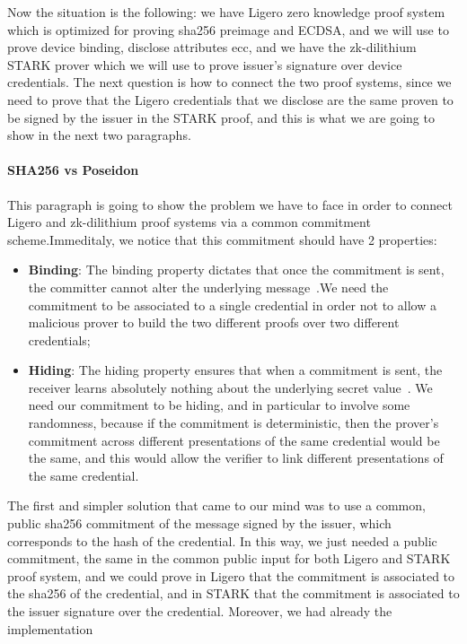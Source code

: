 \documentclass{article}
\begin{document}
Now the situation is the following: we have Ligero zero knowledge proof system which is optimized for proving sha256 preimage
and ECDSA, and we will use to prove device binding, disclose attributes ecc, and we have the zk-dilithium STARK prover
which we will use to prove issuer's signature over device credentials. The next question is how to connect the two proof systems, 
since we need to prove that the Ligero credentials that we disclose are the same proven to be signed by the issuer in the STARK proof,
and this is what we are going to show in the next two paragraphs.

\paragraph{SHA256 vs Poseidon}
This paragraph is going to show the problem we have to face in order to connect Ligero and zk-dilithium proof systems via a 
common commitment scheme.Immeditaly, we notice that this commitment should have 2 properties:
\begin{itemize}
      \item \textbf{Binding}: The binding property dictates that once the commitment is sent, the committer cannot alter the underlying 
      message~\cite{Damgard1999}.We need the commitment to be associated to a single credential in order not to allow a malicious
      prover to build the two different proofs over two different credentials;
      \item \textbf{Hiding}: The hiding property ensures that when a commitment is sent, the receiver learns absolutely nothing about 
      the underlying secret value~\cite{Damgard1999}. We need our commitment to be hiding, and in particular to involve some randomness,
      because if the commitment is deterministic, then the prover's commitment across different presentations of the same credential
      would be the same, and this would allow the verifier to link different presentations of the same credential.
\end{itemize}
The first and simpler solution that came to our mind was to use a common, public sha256 commitment of the message signed by the issuer,
which corresponds to the hash of the credential. In this way, we just needed a public commitment, the same in the common public input
for both Ligero and STARK proof system, and we could prove in Ligero that the commitment is associated to the sha256 of the credential,
and in STARK that the commitment is associated to the issuer signature over the credential. Moreover, we had already the implementation
\end{document}
